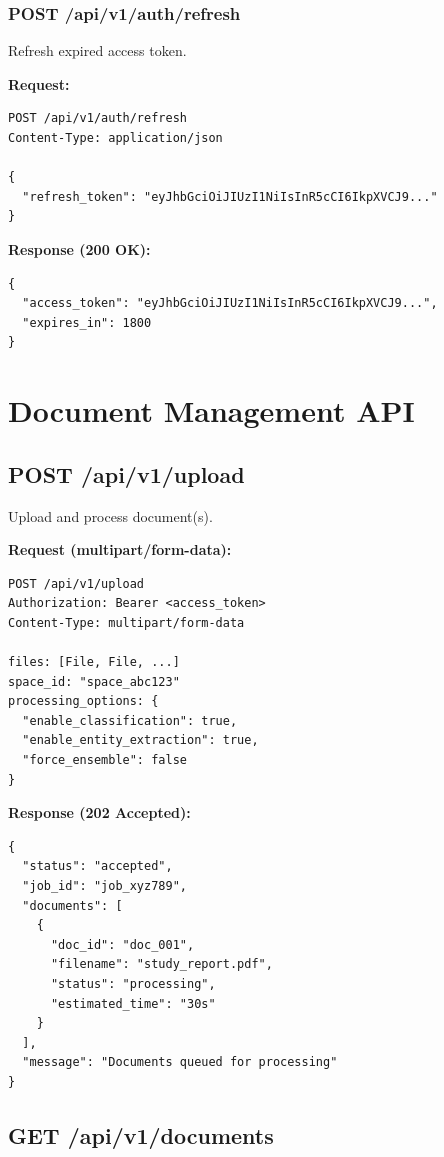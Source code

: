 \subsubsection{POST /api/v1/auth/refresh}

Refresh expired access token.

\textbf{Request:}
\begin{lstlisting}[style=pythonstyle]
POST /api/v1/auth/refresh
Content-Type: application/json

{
  "refresh_token": "eyJhbGciOiJIUzI1NiIsInR5cCI6IkpXVCJ9..."
}
\end{lstlisting}

\textbf{Response (200 OK):}
\begin{lstlisting}[style=pythonstyle]
{
  "access_token": "eyJhbGciOiJIUzI1NiIsInR5cCI6IkpXVCJ9...",
  "expires_in": 1800
}
\end{lstlisting}

\section{Document Management API}

\subsection{POST /api/v1/upload}

Upload and process document(s).

\textbf{Request (multipart/form-data):}
\begin{lstlisting}[style=pythonstyle]
POST /api/v1/upload
Authorization: Bearer <access_token>
Content-Type: multipart/form-data

files: [File, File, ...]
space_id: "space_abc123"
processing_options: {
  "enable_classification": true,
  "enable_entity_extraction": true,
  "force_ensemble": false
}
\end{lstlisting}

\textbf{Response (202 Accepted):}
\begin{lstlisting}[style=pythonstyle]
{
  "status": "accepted",
  "job_id": "job_xyz789",
  "documents": [
    {
      "doc_id": "doc_001",
      "filename": "study_report.pdf",
      "status": "processing",
      "estimated_time": "30s"
    }
  ],
  "message": "Documents queued for processing"
}
\end{lstlisting}

\subsection{GET /api/v1/documents}

